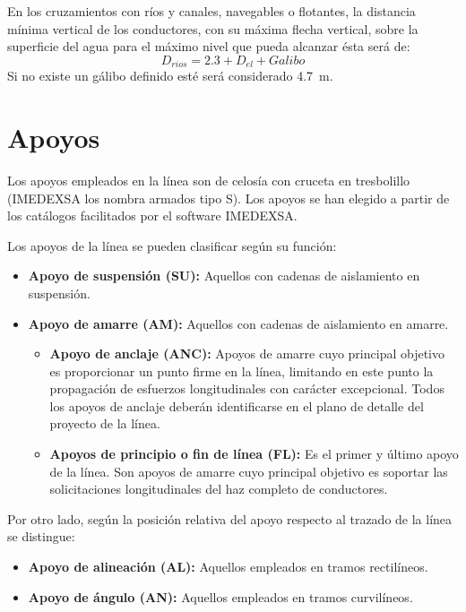 En los cruzamientos con ríos y canales, navegables o flotantes, la distancia mínima vertical de los conductores, con su máxima flecha vertical, sobre la superficie del agua para el máximo nivel que pueda alcanzar ésta será de: 
\begin{equation}
    D_{rios}=2.3+D_{el}+Galibo
    \label{eq:dist-otras-rios}
\end{equation}
Si no existe un gálibo definido esté será considerado \SI{4.7}{\meter}.
\section{Apoyos}
\label{sec:mc-apoyos}
Los apoyos empleados en la línea son de celosía con cruceta en tresbolillo (IMEDEXSA los nombra armados tipo S). Los apoyos se han elegido a partir de los catálogos facilitados por el software IMEDEXSA.

Los apoyos de la línea se pueden clasificar según su función:
\begin{itemize}
    \item \textbf{Apoyo de suspensión (SU):} Aquellos con cadenas de aislamiento en suspensión.
    \item \textbf{Apoyo de amarre (AM):} Aquellos con cadenas de aislamiento en amarre.
    \begin{itemize}
        \item \textbf{Apoyo de anclaje (ANC):} Apoyos de amarre cuyo principal objetivo es proporcionar un punto firme en la línea, limitando en este punto la propagación de esfuerzos longitudinales con carácter excepcional. Todos los apoyos de anclaje deberán identificarse en el plano de detalle del proyecto de la línea.
        \item \textbf{Apoyos de principio o fin de línea (FL):} Es el primer y último apoyo de la línea. Son apoyos de amarre cuyo principal objetivo es soportar las solicitaciones longitudinales del haz completo de conductores.
    \end{itemize}
\end{itemize}

Por otro lado, según la posición relativa del apoyo respecto al trazado de la línea se distingue:
\begin{itemize}
    \item \textbf{Apoyo de alineación (AL):} Aquellos empleados en tramos rectilíneos.
    \item \textbf{Apoyo de ángulo (AN):} Aquellos empleados en tramos curvilíneos.
\end{itemize}
